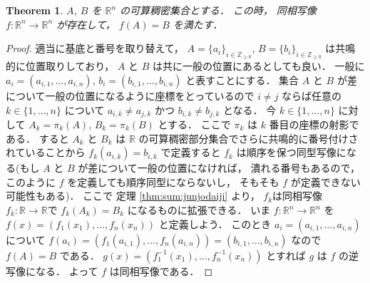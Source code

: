 \documentclass[leqno, a4paper, 12pt]{jsarticle}
\theoremstyle{plain}
\newtheorem{thm}{Theorem}[section]
\theoremstyle{definition}
\theoremstyle{remark}
\newcommand{\zz}{\mathbb{Z}}
\newcommand{\rr}{\mathbb{R}}
\numberwithin{equation}{section}
\begin{document}
\begin{thm}\label{thm:sum:cdh:cdh}
$A$,
$B$
を
$\rr^{n}$
の可算稠密集合とする．
この時，
同相写像
$f\colon \rr^{n}\to \rr^{n}$
が存在して，
$f(A)=B$
を満たす．
\end{thm}
\begin{proof}
適当に基底と番号を取り替えて，
$A=\{a_{i}\}_{i\in \zz_{\ge 0}}$, 
$B=\{b_{i}\}_{i\in \zz_{\ge 0}}$
は共鳴的に位置取りしており，
$A$
と
$B$
は共に一般の位置にあるとしても良い．
一般に
$a_{i}=(a_{i, 1}, \dots,  a_{i, n})$, 
$b_{i}=(b_{i, 1}, \dots,  b_{i, n})$
と表すことにする．
集合
$A$
と
$B$
が差について一般の位置になるように座標をとっているので
$i\neq j$
ならば任意の
$k\in \{1, \dots, n\}$
について
$a_{i, k}\neq a_{j, k}$
かつ
$b_{i, k}\neq b_{j, k}$
となる．
今
$k\in \{1, \dots, n\}$
に対して
$A_{k}=\pi_{k}(A)$, 
$B_{k}=\pi_{k}(B)$
とする．
ここで
$\pi_{k}$
は
$k$
番目の座標の射影である．
すると
$A_{k}$
と
$B_{k}$
は
$\rr$
の可算稠密部分集合でさらに共鳴的に番号付けされていることから
$f_{k}(a_{i, k})=b_{i, k}$
で定義すると
$f_{k}$
は順序を保つ同型写像になる(もし
$A$
と
$B$
が差について一般の位置になければ，
潰れる番号もあるので，
このように
$f$
を定義しても順序同型にならないし，
そもそも
$f$
が定義できない可能性もある)．
ここで
定理 
\ref{thm:sum:junjodaiji}
より，
$f_{k}$は同相写像
$f_{k}\colon  \rr\to \rr$で
$f_{k}(A_{k})=B_{k}$
になるものに拡張できる．
いま
$f\colon  \rr^{n}\to \rr^{n}$
を
$f(x)=(f_{1}(x_{1}), \dots, f_{n}(x_{n}))$
と定義しよう．
このとき
$a_{i}=(a_{i, 1}, \dots, a_{i, n})$
について
$f(a_{i})=
(f_{1}(a_{i, 1}), \dots, f_{n}(a_{i, n}))
=(b_{i, 1}, \dots, b_{i, n})$
なので
$f(A)=B$
である．
$g(x)=(f_{1}^{-1}(x_{1}), \dots, f_{n}^{-1}(x_{n}))$
とすれば
$g$
は
$f$
の逆写像になる．
よって
$f$
は同相写像である．
\end{proof}
\end{document}

